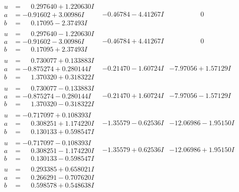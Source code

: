 \documentclass[1p]{elsarticle_modified}
\theoremstyle{definition}
\begin{document}
$$\begin{array}{c|c|c}
\begin{aligned}
u &= \phantom{-}0.297640 + 1.220630 I \\
a &= -0.91602 + 3.00986 I \\
b &= \phantom{-}0.17095 - 2.37493 I\end{aligned}
 & -0.46784 - 4.41267 I & \phantom{-0.000000 } 0 \\ \hline\begin{aligned}
u &= \phantom{-}0.297640 - 1.220630 I \\
a &= -0.91602 - 3.00986 I \\
b &= \phantom{-}0.17095 + 2.37493 I\end{aligned}
 & -0.46784 + 4.41267 I & \phantom{-0.000000 } 0 \\ \hline\begin{aligned}
u &= \phantom{-}0.730077 + 0.133883 I \\
a &= -0.875274 + 0.280144 I \\
b &= \phantom{-}1.370320 + 0.318322 I\end{aligned}
 & -0.21470 - 1.60724 I & -7.97056 + 1.57129 I \\ \hline\begin{aligned}
u &= \phantom{-}0.730077 - 0.133883 I \\
a &= -0.875274 - 0.280144 I \\
b &= \phantom{-}1.370320 - 0.318322 I\end{aligned}
 & -0.21470 + 1.60724 I & -7.97056 - 1.57129 I \\ \hline\begin{aligned}
u &= -0.717097 + 0.108393 I \\
a &= \phantom{-}0.308251 + 1.174220 I \\
b &= \phantom{-}0.130133 + 0.598547 I\end{aligned}
 & -1.35579 - 0.62536 I & -12.06986 - 1.95150 I \\ \hline\begin{aligned}
u &= -0.717097 - 0.108393 I \\
a &= \phantom{-}0.308251 - 1.174220 I \\
b &= \phantom{-}0.130133 - 0.598547 I\end{aligned}
 & -1.35579 + 0.62536 I & -12.06986 + 1.95150 I \\ \hline\begin{aligned}
u &= \phantom{-}0.293385 + 0.658021 I \\
a &= \phantom{-}0.266291 - 0.707620 I \\
b &= \phantom{-}0.598578 + 0.548638 I\end{aligned}

\end{array}$$
\end{document}
